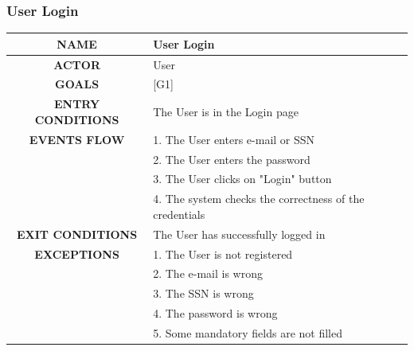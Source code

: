 \documentclass[12pt,a4paper]{article}
\begin{document}
		\subsubsection{User Login}
		\begin{center}
			\begin{tabular}{| c | l |}
				\hline
				\textbf{NAME} & User Login \\
				\hline
				\textbf{ACTOR} & User \\
				\hline
				\textbf{GOALS} & [G1] \\
				\hline
				\textbf{ENTRY CONDITIONS} & The User is in the Login page \\ \hline
				\textbf{EVENTS FLOW}  &
				1. The User enters e-mail or SSN\\
				&2. The User enters the password\\
				&3. The User clicks on "Login" button\\
				&4. The system checks the correctness of the credentials\\
				\hline
				\textbf{EXIT CONDITIONS}  & The User has successfully logged in \\ \hline
				\textbf{EXCEPTIONS} &
				1. The User is not registered\\
				&2. The e-mail is wrong\\
				&3. The SSN is wrong\\
				&4. The password is wrong\\
				&5. Some mandatory fields are not filled\\
				\hline
			\end{tabular}
		\end{center}
\end{document}
